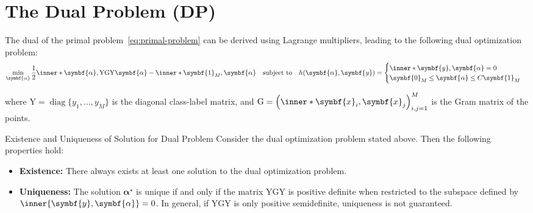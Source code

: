 \section{The Dual Problem (DP)}
The dual of the primal problem~\eqref{eq:primal-problem} can be derived using Lagrange multipliers, leading to the following dual optimization problem:
\begin{align}\label{eq:dual-problem}
  \min_{\symbf{\alpha}}\frac{1}{2} \inner*{\symbf{\alpha}, \mathrm{Y} \mathrm{G} \mathrm{Y} \symbf{\alpha}} - \inner*{\symbf{1}_M, \symbf{\alpha}}
  \quad \text{subject to} \quad
  h(\symbf{\alpha}, \symbf{y}) =
  \begin{cases}
    \inner*{\symbf{y}, \symbf{\alpha}} = 0 \\
    \symbf{0}_M \leq \symbf{\alpha} \leq C\symbf{1}_M
  \end{cases}
\end{align}

where \(\mathrm{Y} = \operatorname{diag}\{y_1, \ldots, y_M\}\) is the diagonal class-label matrix, and \(\mathrm{G} = \left(\inner*{\symbf{x}_i, \symbf{x}_j}\right)_{i,j=1}^M\) is the Gram matrix of the points.

\begin{theorem}{Existence and Uniqueness of Solution for Dual Problem}{}
  Consider the dual optimization problem stated above. Then the following properties hold:
  \begin{itemize}
    \item[(i)] \textbf{Existence:} There always exists at least one solution to the dual optimization problem.
    \item[(ii)] \textbf{Uniqueness:} The solution \(\symbf{\alpha}^\star\) is unique if and only if the matrix \(\mathrm{Y}\mathrm{G}\mathrm{Y}\) is positive definite when restricted to the subspace defined by \(\inner{\symbf{y},\symbf{\alpha}}=0\). In general, if \(\mathrm{Y}\mathrm{G}\mathrm{Y}\) is only positive semidefinite, uniqueness is not guaranteed.
  \end{itemize}
\end{theorem}

